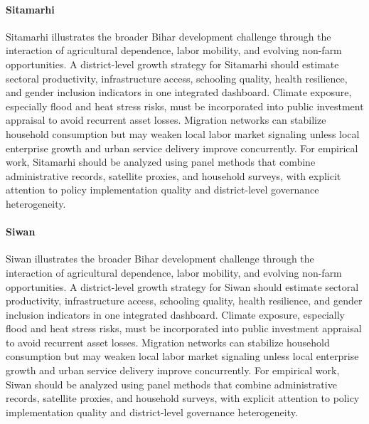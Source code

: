 \documentclass[preprint,12pt]{elsarticle}
\begin{document}
\paragraph{Sitamarhi} Sitamarhi illustrates the broader Bihar development challenge through the interaction of agricultural dependence, labor mobility, and evolving non-farm opportunities. A district-level growth strategy for Sitamarhi should estimate sectoral productivity, infrastructure access, schooling quality, health resilience, and gender inclusion indicators in one integrated dashboard. Climate exposure, especially flood and heat stress risks, must be incorporated into public investment appraisal to avoid recurrent asset losses. Migration networks can stabilize household consumption but may weaken local labor market signaling unless local enterprise growth and urban service delivery improve concurrently. For empirical work, Sitamarhi should be analyzed using panel methods that combine administrative records, satellite proxies, and household surveys, with explicit attention to policy implementation quality and district-level governance heterogeneity.

\paragraph{Siwan} Siwan illustrates the broader Bihar development challenge through the interaction of agricultural dependence, labor mobility, and evolving non-farm opportunities. A district-level growth strategy for Siwan should estimate sectoral productivity, infrastructure access, schooling quality, health resilience, and gender inclusion indicators in one integrated dashboard. Climate exposure, especially flood and heat stress risks, must be incorporated into public investment appraisal to avoid recurrent asset losses. Migration networks can stabilize household consumption but may weaken local labor market signaling unless local enterprise growth and urban service delivery improve concurrently. For empirical work, Siwan should be analyzed using panel methods that combine administrative records, satellite proxies, and household surveys, with explicit attention to policy implementation quality and district-level governance heterogeneity.
\end{document}
